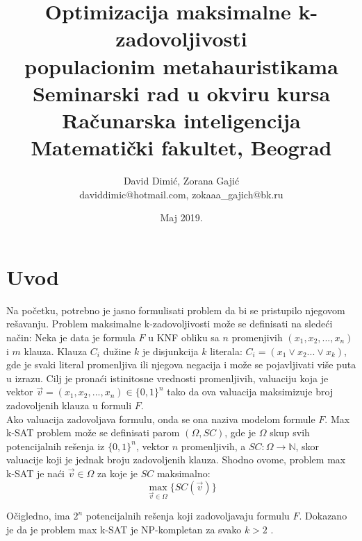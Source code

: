 \documentclass[a4paper]{article}
\title{Optimizacija maksimalne k-zadovoljivosti\\ populacionim metahauristikama\\ \small{Seminarski rad u okviru kursa\\ Računarska inteligencija\\ Matematički fakultet, Beograd}}
\author{David Dimić, Zorana Gajić \\ daviddimic@hotmail.com, zokaaa\_gajich@bk.ru}
\date{Maj 2019.}
\begin{document}
\maketitle



\setcounter{tocdepth}{2} 
\tableofcontents

\newpage


\section{Uvod}
\label{sec:uvod}
Na početku, potrebno je jasno formulisati problem da bi se pristupilo njegovom rešavanju.
Problem maksimalne k-zadovoljivosti može se definisati na sledeći način: 
Neka je data je formula $F$ u KNF obliku sa $n$ 
promenjivih $(x_1, x_2, ..., x_n)$ i $m$ klauza.
Klauza $C_i$ dužine $k$ je disjunkcija $k$ literala: 
$C_i = (x_1  \vee x_2 ... \vee x_k)$, gde je svaki literal promenljiva ili 
njegova negacija i može se pojavljivati više puta u izrazu.
Cilj je pronaći istinitosne vrednosti promenljivih, valuaciju koja je 
vektor $\vec{v} = (x_1, x_2, ..., x_n) \in \{ 0,1 \}^n$ tako da ova valuacija 
maksimizuje broj zadovoljenih klauza u formuli $F$.\\

Ako valuacija zadovoljava formulu, onda se ona naziva modelom formule $F$. 
Max k-SAT problem može se definisati parom $(\Omega, SC)$, gde je $\Omega$ skup svih
potencijalnih rešenja iz $\{0,1\}^n$, vektor $n$ promenljivih, 
a $SC:\Omega \rightarrow \mathbb{N}$, skor valuacije koji je jednak broju zadovoljenih klauza. 
Shodno ovome, problem max k-SAT je naći $\vec{v} \in \Omega$ za koje je $SC$ maksimalno:
$$\max_{\vec{v} \in \Omega}\{SC(\vec{v})\}$$

Očigledno, ima $2^n$ potencijalnih rešenja koji zadovoljavaju formulu $F$. 
Dokazano je da je problem max k-SAT je NP-kompletan za svako $k>2$ \cite{NP-complete}.\\
\end{document}
